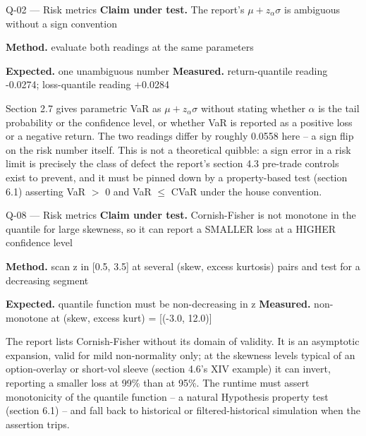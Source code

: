 \begin{caveat}{Q-02 \; ---  Risk metrics}
\textbf{Claim under test.} The report's $\mu+z_\alpha\sigma$ is ambiguous without a sign convention

\textbf{Method.} evaluate both readings at the same parameters

\textbf{Expected.} one unambiguous number \quad \textbf{Measured.} return-quantile reading -0.0274; loss-quantile reading +0.0284

Section 2.7 gives parametric VaR as $\mu+z_\alpha\sigma$ without stating whether $\alpha$ is the tail probability or the confidence level, or whether VaR is reported as a positive loss or a negative return. The two readings differ by roughly 0.0558 here -- a sign flip on the risk number itself. This is not a theoretical quibble: a sign error in a risk limit is precisely the class of defect the report's section 4.3 pre-trade controls exist to prevent, and it must be pinned down by a property-based test (section 6.1) asserting VaR $>$ 0 and VaR $\le$ CVaR under the house convention.
\end{caveat}

\begin{caveat}{Q-08 \; ---  Risk metrics}
\textbf{Claim under test.} Cornish-Fisher is not monotone in the quantile for large skewness, so it can report a SMALLER loss at a HIGHER confidence level

\textbf{Method.} scan z in [0.5, 3.5] at several (skew, excess kurtosis) pairs and test for a decreasing segment

\textbf{Expected.} quantile function must be non-decreasing in z \quad \textbf{Measured.} non-monotone at (skew, excess kurt) = [(-3.0, 12.0)]

The report lists Cornish-Fisher without its domain of validity. It is an asymptotic expansion, valid for mild non-normality only; at the skewness levels typical of an option-overlay or short-vol sleeve (section 4.6's XIV example) it can invert, reporting a smaller loss at 99\% than at 95\%. The runtime must assert monotonicity of the quantile function -- a natural Hypothesis property test (section 6.1) -- and fall back to historical or filtered-historical simulation when the assertion trips.
\end{caveat}

